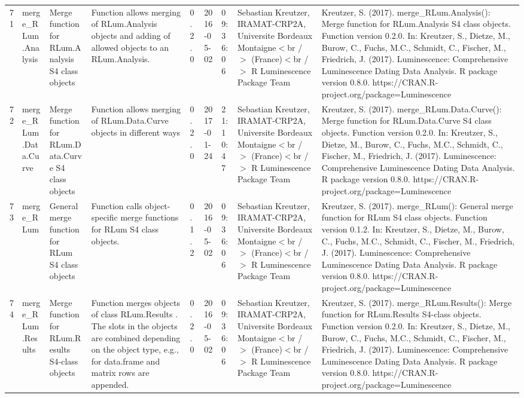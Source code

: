 \begin{table}[ht]
\begin{tabular}{rllllllll}
 \\ 
  71 & merge\_RLum.Analysis & Merge function for RLum.Analysis S4 class objects & Function allows merging of RLum.Analysis objects and adding of allowed objects to an RLum.Analysis. & 0.2.0 & 2016-05-02 & 09:36:06
 & Sebastian Kreutzer, IRAMAT-CRP2A, Universite Bordeaux Montaigne$<$br /$>$ (France)$<$br /$>$  R Luminescence Package Team & Kreutzer, S. (2017). merge\_RLum.Analysis(): Merge function for RLum.Analysis S4 class objects. Function version 0.2.0. In: Kreutzer, S., Dietze, M., Burow, C., Fuchs, M.C., Schmidt, C., Fischer, M., Friedrich, J. (2017). Luminescence: Comprehensive Luminescence Dating Data Analysis. R package version 0.8.0. https://CRAN.R-project.org/package=Luminescence
 \\ 
  72 & merge\_RLum.Data.Curve & Merge function for RLum.Data.Curve S4 class objects & Function allows merging of RLum.Data.Curve objects in different ways & 0.2.0 & 2017-01-24 & 21:10:47
 & Sebastian Kreutzer, IRAMAT-CRP2A, Universite Bordeaux Montaigne$<$br /$>$ (France)$<$br /$>$  R Luminescence Package Team & Kreutzer, S. (2017). merge\_RLum.Data.Curve(): Merge function for RLum.Data.Curve S4 class objects. Function version 0.2.0. In: Kreutzer, S., Dietze, M., Burow, C., Fuchs, M.C., Schmidt, C., Fischer, M., Friedrich, J. (2017). Luminescence: Comprehensive Luminescence Dating Data Analysis. R package version 0.8.0. https://CRAN.R-project.org/package=Luminescence
 \\ 
  73 & merge\_RLum & General merge function for RLum S4 class objects & Function calls object-specific merge functions for RLum S4 class objects. & 0.1.2 & 2016-05-02 & 09:36:06
 & Sebastian Kreutzer, IRAMAT-CRP2A, Universite Bordeaux Montaigne$<$br /$>$ (France)$<$br /$>$  R Luminescence Package Team & Kreutzer, S. (2017). merge\_RLum(): General merge function for RLum S4 class objects. Function version 0.1.2. In: Kreutzer, S., Dietze, M., Burow, C., Fuchs, M.C., Schmidt, C., Fischer, M., Friedrich, J. (2017). Luminescence: Comprehensive Luminescence Dating Data Analysis. R package version 0.8.0. https://CRAN.R-project.org/package=Luminescence
 \\ 
  74 & merge\_RLum.Results & Merge function for RLum.Results S4-class objects & Function merges objects of class  RLum.Results . The slots in the objects are combined depending on the object type, e.g., for  data.frame  and  matrix  rows are appended. & 0.2.0 & 2016-05-02 & 09:36:06
 & Sebastian Kreutzer, IRAMAT-CRP2A, Universite Bordeaux Montaigne$<$br /$>$ (France)$<$br /$>$  R Luminescence Package Team & Kreutzer, S. (2017). merge\_RLum.Results(): Merge function for RLum.Results S4-class objects. Function version 0.2.0. In: Kreutzer, S., Dietze, M., Burow, C., Fuchs, M.C., Schmidt, C., Fischer, M., Friedrich, J. (2017). Luminescence: Comprehensive Luminescence Dating Data Analysis. R package version 0.8.0. https://CRAN.R-project.org/package=Luminescence

\end{tabular}
\end{table}
